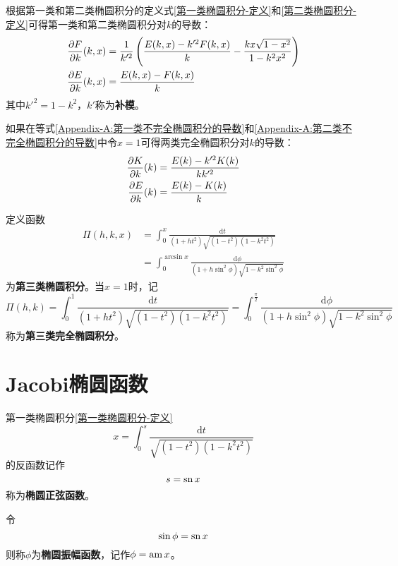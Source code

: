 根据第一类和第二类椭圆积分的定义式\eqref{第一类椭圆积分-定义}和\eqref{第二类椭圆积分-定义}可得第一类和第二类椭圆积分对$k$的导数：
\begin{align}
	\dfrac{\partial F}{\partial k}(k,x) & = \frac{1}{k'^2}\left(\frac{E(k,x)-k'^2F(k,x)}{k}-\frac{kx\sqrt{1-x^2}}{1-k^2x^2}\right) \label{Appendix-A:第一类不完全椭圆积分的导数} \\
	\dfrac{\partial E}{\partial k}(k,x) & = \frac{E(k,x)-F(k,x)}{k} \label{Appendix-A:第二类不完全椭圆积分的导数} 
\end{align}
其中$k'^2=1-k^2$，$k'$称为{\bf 补模}。

如果在等式\eqref{Appendix-A:第一类不完全椭圆积分的导数}和\eqref{Appendix-A:第二类不完全椭圆积分的导数}中令$x=1$可得两类完全椭圆积分对$k$的导数：
\begin{align}
	\dfrac{\partial K}{\partial k}(k) & = \frac{E(k)-k'^2K(k)}{kk'^2} \label{Appendix-A:第一类完全椭圆积分的导数} \\
	\dfrac{\partial E}{\partial k}(k) & = \frac{E(k)-K(k)}{k} \label{Appendix-A:第二类完全椭圆积分的导数}
\end{align}

定义函数
\begin{align}
	\varPi(h,k,x) & = \int_0^x \frac{\mathrm{d}t}{(1+ht^2)\sqrt{(1-t^2)(1-k^2t^2)}} \nonumber \\
	& = \int_0^{\arcsin x} \frac{\mathrm{d}\phi}{(1+h\sin^2\phi)\sqrt{1-k^2\sin^2\phi}}
\end{align}
为{\bf 第三类椭圆积分}。当$x=1$时，记
\begin{equation}
	\varPi(h,k) = \int_0^1 \frac{\mathrm{d}t}{(1+ht^2)\sqrt{(1-t^2)(1-k^2t^2)}} = \int_0^{\frac{\pi}{2}} \frac{\mathrm{d}\phi}{(1+h\sin^2\phi)\sqrt{1-k^2\sin^2\phi}}
\end{equation}
称为{\bf 第三类完全椭圆积分}。

\section{Jacobi椭圆函数}

第一类椭圆积分\eqref{第一类椭圆积分-定义}
\begin{equation*}
	x = \int_0^s \frac{\mathrm{d}t}{\sqrt{(1-t^2)(1-k^2t^2)}}
\end{equation*}
的反函数记作
\begin{equation}
	s = \mathrm{sn}\, x
\end{equation}
称为{\bf 椭圆正弦函数}。

令
\begin{equation}
	\sin \phi = \mathrm{sn}\, x
\end{equation}
则称$\phi$为{\bf 椭圆振幅函数}，记作$\phi = \mathrm{am}\, x$。

